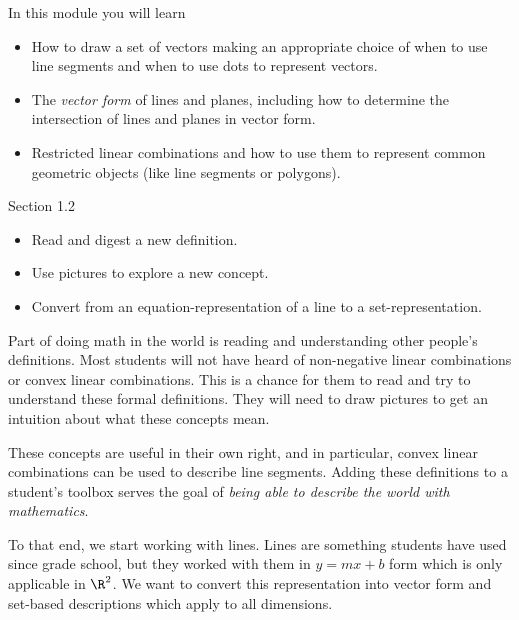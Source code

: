 \documentclass{problemset}
\begin{document}
\begin{module}

	In this module you will learn
	\begin{itemize}
		\item How to draw a set of vectors making an appropriate choice of when to use
			line segments and when to use dots to represent vectors.
		\item The \emph{vector form} of lines and planes, including how to determine
			the intersection of lines and planes in vector form.
		\item Restricted linear combinations and how to use them to represent common geometric
			objects (like line segments or polygons).
	\end{itemize}

	
	
\end{module}
\begin{lesson}

	 Section 1.2

	\begin{itemize}
		\item Read and digest a new definition.

		\item Use pictures to explore a new concept.

		\item Convert from an equation-representation of a line to a set-representation.
	\end{itemize}

	 Part of doing math in the world is reading and understanding
	other people's definitions. Most students will not have heard of non-negative
	linear combinations or convex linear combinations. This is a chance for them
	to read and try to understand these formal definitions. They will need to
	draw pictures to get an intuition about what these concepts mean.

	These concepts are useful in their own right, and in particular, convex linear
	combinations can be used to describe line segments. Adding these definitions
	to a student's toolbox serves the goal of \emph{being able to describe
	the world with mathematics}.

	To that end, we start working with lines. Lines are something students have
	used since grade school, but they worked with them in $y=mx+b$ form which
	is only applicable in $\R^{2}$. We want to convert this representation
	into vector form and set-based descriptions which apply to all
	dimensions.

\end{lesson}
\end{document}
